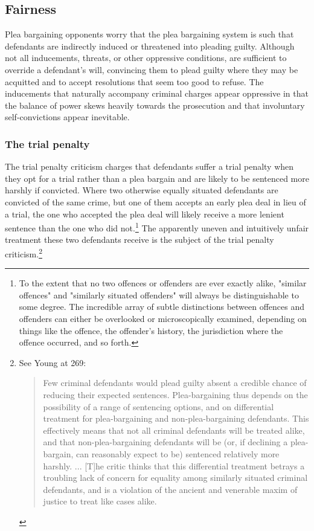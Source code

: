 \subsection{Fairness}

Plea bargaining opponents worry that the plea bargaining system is such that defendants are indirectly induced or threatened into pleading guilty. Although not all inducements, threats, or other oppressive conditions, are sufficient to override a defendant's will, convincing them to plead guilty where they may be acquitted and to accept resolutions that seem too good to refuse. The inducements that naturally accompany criminal charges appear oppressive in that the balance of power skews heavily towards the prosecution and that involuntary self-convictions appear inevitable. 

\subsubsection{The trial penalty}

The trial penalty criticism charges that defendants suffer a trial penalty when they opt for a trial rather than a plea bargain and are likely to be sentenced more harshly if convicted. Where two otherwise equally situated defendants are convicted of the same crime, but one of them accepts an early plea deal in lieu of a trial, the one who accepted the plea deal will likely receive a more lenient sentence than the one who did not.\footnote{To the extent that no two offences or offenders are ever exactly alike, "similar offences" and "similarly situated offenders" will always be distinguishable to some degree. The incredible array of subtle distinctions between offences and offenders can either be overlooked or microscopically examined, depending on things like the offence, the offender's history, the jurisdiction where the offence occurred, and so forth.} The apparently uneven and intuitively unfair treatment these two defendants receive is the subject of the trial penalty criticism.\footnote{See Young at 269: 
\begin{quote}
    Few criminal defendants would plead guilty absent a credible chance of reducing their expected sentences. Plea-bargaining thus depends on the possibility of a range of sentencing options, and on differential treatment for plea-bargaining and non-plea-bargaining defendants. This effectively means that not all criminal defendants will be treated alike, and that non-plea-bargaining defendants will be (or, if declining a plea-bargain, can reasonably expect to be) sentenced relatively more harshly. ... [T]he critic thinks that this differential treatment betrays a troubling lack of concern for equality among similarly situated criminal defendants, and is a violation of the ancient and venerable maxim of justice to treat like cases alike.
\end{quote}}


